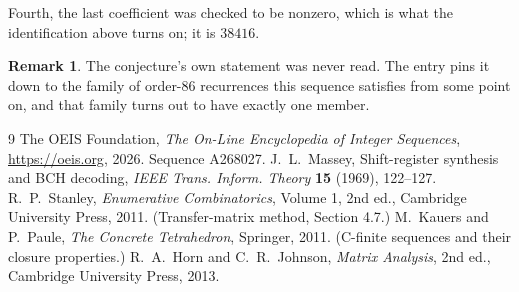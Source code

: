\documentclass[11pt,a4paper]{article}
\theoremstyle{plain}
\theoremstyle{definition}
\newtheorem{remark}[theorem]{Remark}
\begin{document}
Fourth, the last coefficient was checked to be nonzero, which is what the identification above
turns on; it is $38416$.

\begin{remark}
The conjecture's own statement was never read. The entry pins it down to the family of
order-$86$ recurrences this sequence satisfies from some point on, and that family turns
out to have exactly one member.
\end{remark}

\begin{thebibliography}{9}
 The OEIS Foundation, \emph{The On-Line Encyclopedia of Integer
Sequences}, \url{https://oeis.org}, 2026. Sequence A268027.
 J.~L.~Massey, Shift-register synthesis and BCH decoding, \emph{IEEE
Trans. Inform. Theory} \textbf{15} (1969), 122--127.
 R.~P.~Stanley, \emph{Enumerative Combinatorics}, Volume 1, 2nd ed.,
Cambridge University Press, 2011. (Transfer-matrix method, Section 4.7.)
 M.~Kauers and P.~Paule, \emph{The Concrete Tetrahedron}, Springer, 2011.
(C-finite sequences and their closure properties.)
 R.~A.~Horn and C.~R.~Johnson, \emph{Matrix Analysis}, 2nd ed., Cambridge
University Press, 2013.
\end{thebibliography}
\end{document}
